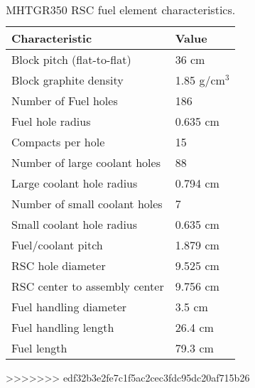 \documentclass[11pt,letterpaper]{article}
\begin{document}
	\begin{table}[htbp!]
		\centering
	    \caption{MHTGR350 RSC fuel element characteristics.}
	    \label{tab:rcharacteristics}
		\begin{tabular}{l|l}
		\hline
		Characteristic                   & Value         \\ \hline
		Block pitch (flat-to-flat)       & 36 cm         \\
		Block graphite density           & 1.85 g/cm$^3$ \\
		Number of Fuel holes             & 186           \\
		Fuel hole radius                 & 0.635 cm      \\
		Compacts per hole                & 15            \\
		Number of large coolant holes    & 88            \\
		Large coolant hole radius        & 0.794 cm      \\
		Number of small coolant holes    & 7             \\
		Small coolant hole radius        & 0.635 cm      \\
		Fuel/coolant pitch               & 1.879 cm      \\ 
		RSC hole diameter                & 9.525 cm      \\
		RSC center to assembly center    & 9.756 cm      \\
		Fuel handling diameter           & 3.5 cm        \\ 
		Fuel handling length             & 26.4 cm       \\
		Fuel length                      & 79.3 cm       \\ \hline
		\end{tabular}
	\end{table}

>>>>>>> edf32b3e2fe7c1f5ac2cec3fdc95dc20af715b26
\pagebreak


\end{document}
